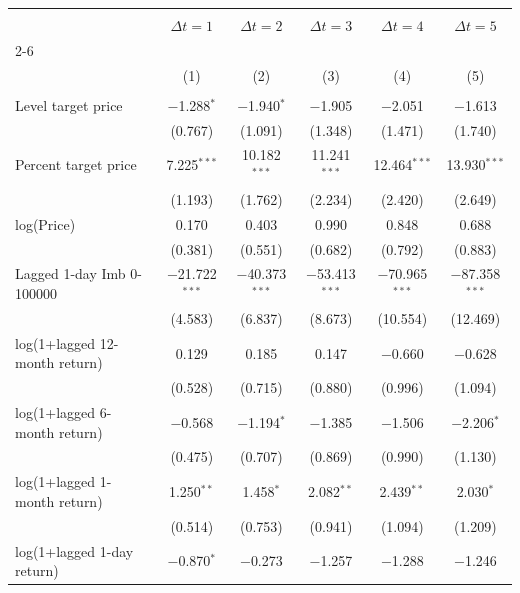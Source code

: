 
\begin{tabular}{@{\extracolsep{5pt}}lccccc} 
\\[-1.8ex]\hline 
\hline \\[-1.8ex] 
 & \multicolumn{1}{c}{\textbf{$\Delta t = 1$}} & \multicolumn{1}{c}{\textbf{$\Delta t = 2$}} & \multicolumn{1}{c}{\textbf{$\Delta t = 3$}} & \multicolumn{1}{c}{\textbf{$\Delta t = 4$}} & \multicolumn{1}{c}{\textbf{$\Delta t = 5$}} \\
\cline{2-6} 
\\[-1.8ex] & (1) & (2) & (3) & (4) & (5)\\ 
\hline \\[-1.8ex] 
 Level target price & $-$1.288$^{*}$ & $-$1.940$^{*}$ & $-$1.905 & $-$2.051 & $-$1.613 \\ 
  & (0.767) & (1.091) & (1.348) & (1.471) & (1.740) \\ 
  Percent target price & 7.225$^{***}$ & 10.182$^{***}$ & 11.241$^{***}$ & 12.464$^{***}$ & 13.930$^{***}$ \\ 
  & (1.193) & (1.762) & (2.234) & (2.420) & (2.649) \\ 
  log(Price) & 0.170 & 0.403 & 0.990 & 0.848 & 0.688 \\ 
  & (0.381) & (0.551) & (0.682) & (0.792) & (0.883) \\ 
  Lagged 1-day Imb 0-100000 & $-$21.722$^{***}$ & $-$40.373$^{***}$ & $-$53.413$^{***}$ & $-$70.965$^{***}$ & $-$87.358$^{***}$ \\ 
  & (4.583) & (6.837) & (8.673) & (10.554) & (12.469) \\ 
  log(1+lagged 12-month return) & 0.129 & 0.185 & 0.147 & $-$0.660 & $-$0.628 \\ 
  & (0.528) & (0.715) & (0.880) & (0.996) & (1.094) \\ 
  log(1+lagged 6-month return) & $-$0.568 & $-$1.194$^{*}$ & $-$1.385 & $-$1.506 & $-$2.206$^{*}$ \\ 
  & (0.475) & (0.707) & (0.869) & (0.990) & (1.130) \\ 
  log(1+lagged 1-month return) & 1.250$^{**}$ & 1.458$^{*}$ & 2.082$^{**}$ & 2.439$^{**}$ & 2.030$^{*}$ \\ 
  & (0.514) & (0.753) & (0.941) & (1.094) & (1.209) \\ 
  log(1+lagged 1-day return) & $-$0.870$^{*}$ & $-$0.273 & $-$1.257 & $-$1.288 & $-$1.246 \\ 

\end{tabular}
